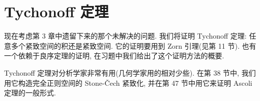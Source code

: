 \documentclass[../main.tex]{subfiles}
\begin{document}
\chapter{Tychonoff 定理}\label{chapter:ch05}

现在考虑第 3 章中遗留下来的那个未解决的问题. 我们将证明 Tychonoff 定理: 任意多个紧致空间的积还是紧致空间. 它的证明要用到 Zorn 引理(见第 11 节). 也有一个依赖于良序定理的证明, 在习题中我们给出了这个证明方法的概要.

Tychonoff 定理对分析学家非常有用(几何学家用的相对少些). 在第 38 节中, 我们用它构造完全正则空间的 Stone-Čech 紧致化, 并在第 47 节中用它来证明 Ascoli 定理的一般形式.



\end{document}
